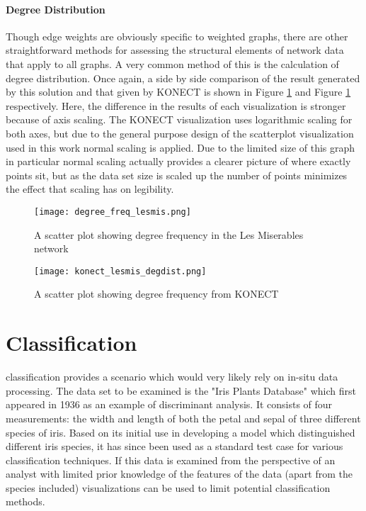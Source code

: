 \paragraph{Degree Distribution}
Though edge weights are obviously specific to weighted graphs, there are other straightforward methods for assessing the structural elements of network data that apply to all graphs. A very common method of this is the calculation of degree distribution. Once again, a side by side comparison of the result generated by this solution and that given by KONECT is shown in Figure \ref{fig:degfreqlesmis} and Figure \ref{fig:degfreqlesmis} respectively. Here, the difference in the results of each visualization is stronger because of axis scaling. The KONECT visualization uses logarithmic scaling for both axes, but due to the general purpose design of the scatterplot visualization used in this work normal scaling is applied. Due to the limited size of this graph in particular normal scaling actually provides a clearer picture of where exactly points sit, but as the data set size is scaled up the number of points minimizes the effect that scaling has on legibility. 

\begin{figure}
	\centering
		\centering
		\texttt{[image: degree\_freq\_lesmis.png]}
		\caption{A scatter plot showing degree frequency in the Les Miserables network}
		\label{fig:degfreqlesmis}
\end{figure}
\begin{figure}
	\centering
		\texttt{[image: konect\_lesmis\_degdist.png]}
		\caption{A scatter plot showing degree frequency from KONECT}
		\label{fig:degfreqkonect}
\end{figure}

\section{Classification}
\label{sec:classification}
 classification provides a scenario which would very likely rely on in-situ data processing. The data set to be examined is the "Iris Plants Database" \citep{Fisher1936} which first appeared in 1936 as an example of discriminant analysis. It consists of four measurements: the width and length of both the petal and sepal of three different species of iris. Based on its initial use in developing a model which distinguished different iris species, it has since been used as a standard test case for various classification techniques. If this data is examined from the perspective of an analyst with limited prior knowledge of the features of the data (apart from the species included) visualizations can be used to limit potential classification methods. 

